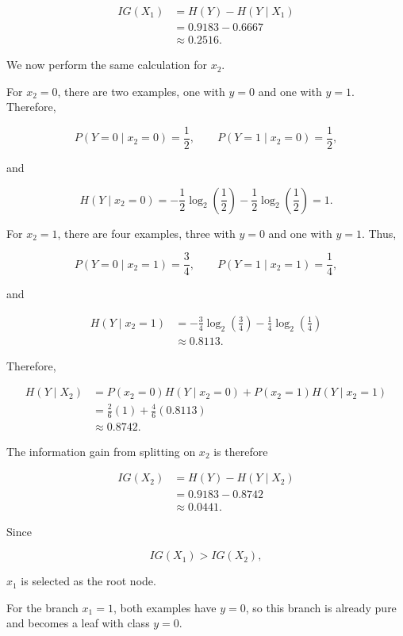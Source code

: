 \documentclass[12pt]{article}
\begin{document}
\begin{enumerate}
\[
\begin{aligned}
IG(X_1)
&=
H(Y)-H(Y\mid X_1) \\
&=
0.9183-0.6667 \\
&\approx 0.2516.
\end{aligned}
\]

We now perform the same calculation for $x_2$.

For $x_2=0$, there are two examples, one with $y=0$ and one with $y=1$. Therefore,

\[
P(Y=0\mid x_2=0)=\frac{1}{2},
\qquad
P(Y=1\mid x_2=0)=\frac{1}{2},
\]

and

\[
H(Y\mid x_2=0)
=
-\frac{1}{2}\log_2\left(\frac{1}{2}\right)
-\frac{1}{2}\log_2\left(\frac{1}{2}\right)
=1.
\]

For $x_2=1$, there are four examples, three with $y=0$ and one with $y=1$. Thus,

\[
P(Y=0\mid x_2=1)=\frac{3}{4},
\qquad
P(Y=1\mid x_2=1)=\frac{1}{4},
\]

and

\[
\begin{aligned}
H(Y\mid x_2=1)
&=
-\frac{3}{4}\log_2\left(\frac{3}{4}\right)
-\frac{1}{4}\log_2\left(\frac{1}{4}\right) \\
&\approx 0.8113.
\end{aligned}
\]

Therefore,

\[
\begin{aligned}
H(Y\mid X_2)
&=
P(x_2=0)H(Y\mid x_2=0)
+
P(x_2=1)H(Y\mid x_2=1) \\
&=
\frac{2}{6}(1)+\frac{4}{6}(0.8113) \\
&\approx 0.8742.
\end{aligned}
\]

The information gain from splitting on $x_2$ is therefore

\[
\begin{aligned}
IG(X_2)
&=
H(Y)-H(Y\mid X_2) \\
&=
0.9183-0.8742 \\
&\approx 0.0441.
\end{aligned}
\]

Since

\[
IG(X_1) > IG(X_2),
\]

$x_1$ is selected as the root node.

For the branch $x_1=1$, both examples have $y=0$, so this branch is already pure and becomes a leaf with class $y=0$.


\end{enumerate}
\end{document}
